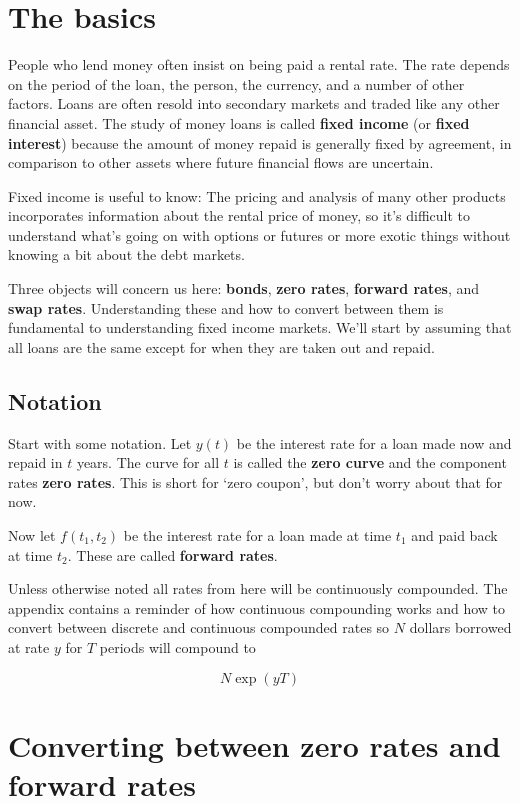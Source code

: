 
\section{The basics}

People who lend money often insist on being paid a rental rate. The rate depends on the period of the loan, the person, the currency, and a number of other factors. Loans are often resold into secondary markets and traded like any other financial asset. The study of money loans is called \textbf{fixed income} (or \textbf{fixed interest}) because the amount of money repaid is generally fixed by agreement, in comparison to other assets where future financial flows are uncertain.

Fixed income is useful to know:  The pricing and analysis of many other products incorporates information about the rental price of money, so it's difficult to understand what's going on with options or futures or more exotic things without knowing a bit about the debt markets.

Three objects will concern us here: \textbf{bonds}, \textbf{zero rates}, \textbf{forward rates}, and \textbf{swap rates}. Understanding these and how to convert between them is fundamental to understanding fixed income markets. We'll start by assuming that all loans are the same except for when they are taken out and repaid.

\subsection{Notation}
Start with some notation. Let $y(t)$ be the interest rate for a loan made now and repaid in $t$ years. The curve for all $t$ is called the \textbf{zero curve} and the component rates \textbf{zero rates}. This is short for `zero coupon', but don't worry about that for now.

Now let $f(t_1,t_2)$ be the interest rate for a loan made at time $t_1$ and paid back at time $t_2$. These are called \textbf{forward rates}.

Unless otherwise noted all rates from here will be continuously compounded. The appendix contains a reminder of how continuous compounding works and how to convert between discrete and continuous compounded rates so $N$ dollars borrowed at rate $y$ for $T$ periods will compound to

\[N\exp (yT) \]


\section{Converting between zero rates and forward rates}


